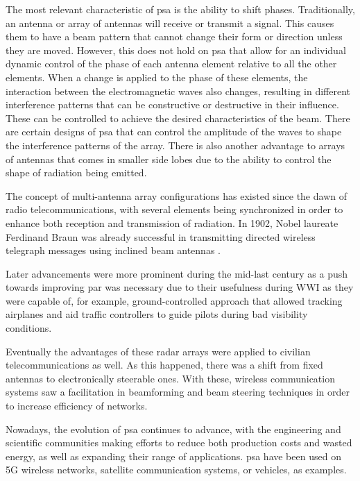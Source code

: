 \par The most relevant characteristic of \ac{psa} is the ability to shift phases. Traditionally, an antenna or array of antennas will receive or transmit a signal. This causes them to have a beam pattern that cannot change their form or direction unless they are moved. However, this does not hold on \ac{psa} that allow for an individual dynamic control of the phase of each antenna element relative to all the other elements. When a change is applied to the phase of these elements, the interaction between the electromagnetic waves also changes, resulting in different interference patterns that can be constructive or destructive in their influence. These can be controlled to achieve the desired characteristics of the beam. There are certain designs of \ac{psa} that can control the amplitude of the waves to shape the interference patterns of the array. There is also another advantage to arrays of antennas that comes in smaller side lobes due to the ability to control the shape of radiation being emitted.

\par The concept of multi-antenna array configurations has existed since the dawn of radio telecommunications, with several elements being synchronized in order to enhance both reception and transmission of radiation. In 1902, Nobel laureate Ferdinand Braun was already successful in transmitting directed wireless telegraph messages using inclined beam antennas \cite{NobelPrize.org2023FerdinandBiographical}.

\par Later advancements were more prominent during the mid-last century as a push towards improving \ac{par} was necessary due to their usefulness during WWI as they were capable of, for example, ground-controlled approach that allowed tracking airplanes and aid traffic controllers to guide pilots during bad visibility conditions.

\par Eventually the advantages of these radar arrays were applied to civilian telecommunications as well. As this happened, there was a shift from fixed antennas to electronically steerable ones. With these, wireless communication systems saw a facilitation in beamforming and beam steering techniques in order to increase efficiency of networks.

\par Nowadays, the evolution of \ac{psa} continues to advance, with the engineering and scientific communities making efforts to reduce both production costs and wasted energy, as well as expanding their range of applications. \ac{psa} have been used on 5G wireless networks, satellite communication systems, or vehicles, as examples.

